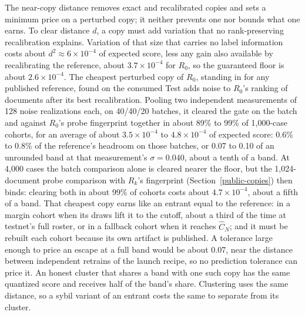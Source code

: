 The near-copy distance removes exact and recalibrated copies and sets a minimum
price on a perturbed copy; it neither prevents one nor bounds what one earns. To
clear distance \(d\), a copy must add
variation that no rank-preserving recalibration explains. Variation of that size
that carries no label information costs about \(d^2\approx6\times10^{-4}\) of
expected score, less any gain also available by recalibrating the reference,
about \(3.7\times10^{-4}\) for \(R_0\), so the guaranteed floor is about
\(2.6\times10^{-4}\). The cheapest perturbed copy of \(R_0\), standing in for any
published reference, found on the consumed Test adds noise to \(R_0\)'s ranking
of documents after its best recalibration.
Pooling two independent measurements of 128 noise realizations each, on
40/40/20 batches, it cleared the gate on the batch and against \(R_0\)'s probe
fingerprint together in about 89\% to 99\% of 1,000-case cohorts, for an
average of about \(3.5\times10^{-4}\) to \(4.8\times10^{-4}\) of expected score:
0.6\% to 0.8\% of the reference's headroom on those batches, or 0.07 to 0.10
of an unrounded band at that measurement's \(\sigma=0.040\), about a tenth of a
band. At 4,000 cases the batch comparison alone is cleared nearer the floor, but the
1,024-document probe comparison with \(R_k\)'s fingerprint
(Section~\ref{public-copies}) then binds: clearing both in about 99\% of cohorts
costs about \(4.7\times10^{-4}\), about a fifth of a band. That cheapest copy
earns like an entrant equal to the reference: in a margin cohort when its draws
lift it to the cutoff, about a third of the time at testnet's full roster, or
in a fallback cohort when it reaches \(\hat C_N\); and it must be rebuilt each
cohort because its own artifact is published. A tolerance
large enough to price an escape at a full band would be
about 0.07, near the distance between independent retrains of the launch
recipe, so no prediction tolerance can price it. An honest cluster that shares
a band with one such copy has the same quantized score and receives half of the
band's share. Clustering uses the same distance, so a sybil variant of an entrant
costs the same to separate from its cluster.

